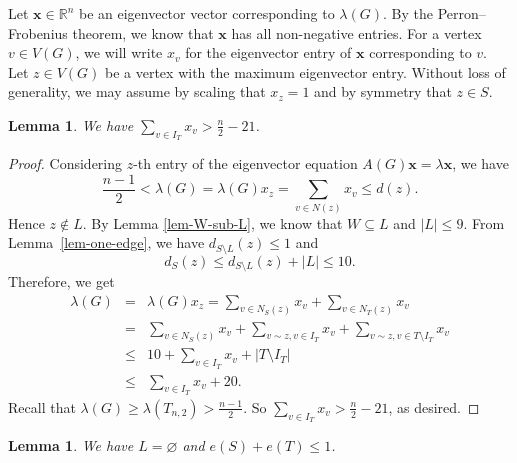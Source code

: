 \documentclass[11pt]{article}
\newtheorem{lemma}[theorem]{Lemma}
\begin{document}
Let $\mathbf{x}\in \mathbb{R}^n$ be an eigenvector vector corresponding to 
$\lambda (G)$. 
By the Perron--Frobenius theorem, we know that 
$\mathbf{x}$ has all non-negative entries. 
For a vertex $v\in V(G)$, we will write ${x}_v$ for 
 the eigenvector entry of $\mathbf{x}$ corresponding to $v$. 
 Let $z\in V(G)$ be a vertex with the maximum eigenvector entry. 
  Without loss of generality, we may assume by scaling that  ${x}_z=1$ and by symmetry that  $z\in S$.


\begin{lemma} \label{lem-IT}
We have $ \sum\limits_{ v\in I_T} {x}_v >  \frac{n}{2} - 21$.
\end{lemma}

\begin{proof} 
Considering $z$-th entry of 
 the eigenvector equation $A(G)\mathbf{x} = \lambda \mathbf{x}$, we have 
 $$  \frac{n-1}{2} < 
 \lambda (G)= \lambda (G) {x}_z = 
 \sum_{v\in N(z)} {x}_v \le d(z).$$
 Hence $z\notin L$. 
  By Lemma \ref{lem-W-sub-L}, we know that $W\subseteq L$ and 
  $|L|\le 9$. 
From Lemma~\ref{lem-one-edge}, we have 
$d_{S\setminus L}(z) \le 1$ and  
 \[  d_S(z)\le d_{S\setminus L}(z) + |L| \le 10. \] 
 Therefore, we get
 \begin{eqnarray*}
 \lambda (G)&= &  \lambda (G) {x}_z  = 
 \sum_{v\in N_S(z)} {x}_v 
 +\sum_{v\in N_T(z)} {x}_v\\
 &=& \sum_{v\in N_S(z)} {x}_v+  \sum_{v\sim z, v\in I_T} {x}_v 
 +\sum_{v\sim z , v\in T\setminus I_T} {x}_v\\  
 &\le&  10 +\sum_{ v\in I_T} {x}_v+ |T \setminus I_T|\\ 
&\le&  \sum_{ v\in I_T} {x}_v  +20.
\end{eqnarray*}
Recall that $\lambda (G)\ge \lambda (T_{n,2}) > \frac{n-1}{2}$. 
 So 
$ \sum\limits_{ v\in I_T} {x}_v> \frac{n}{2} - 21$, as desired.
\end{proof}

\begin{lemma}\label{Lempty}
We have $L = \varnothing$ and  $e(S) + e(T) \le 1$. 
\end{lemma}
\end{document}

